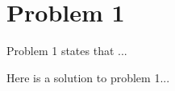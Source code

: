\documentclass[../homework01.tex]{subfile}
\begin{document}
\section*{Problem 1}\label{pr1}

Problem 1 states that ... 

\begin{solution}
Here is a solution to problem 1... 
\end{solution}
\end{document}
